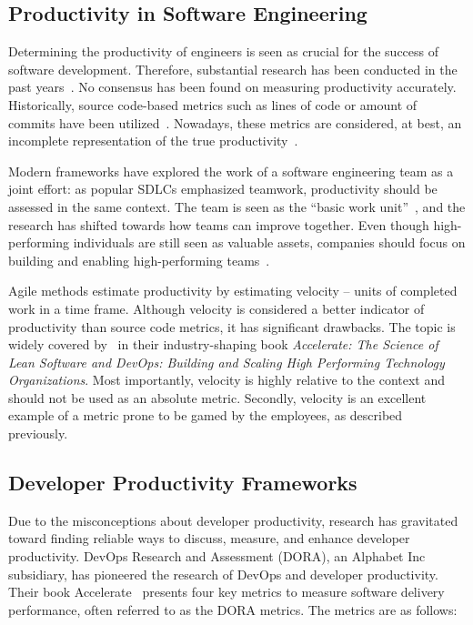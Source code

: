 \subsection{Productivity in Software Engineering}
Determining the productivity of engineers is seen as crucial for the success of software development. Therefore, substantial research has been conducted in the past years~\cite{oliveira_code_2020}. No consensus has been found on measuring productivity accurately. Historically, source code-based metrics such as lines of code or amount of commits have been utilized~\cite{oliveira_code_2020}. Nowadays, these metrics are considered, at best, an incomplete representation of the true productivity~\cite{forsgren_space_2021}.

Modern frameworks have explored the work of a software engineering team as a joint effort: as popular SDLCs emphasized teamwork, productivity should be assessed in the same context. The team is seen as the ``basic work unit''~\cite{moe_overcoming_2010}, and the research has shifted towards how teams can improve together. Even though high-performing individuals are still seen as valuable assets, companies should focus on building and enabling high-performing teams~\cite{forsgren_space_2021}. 

Agile methods estimate productivity by estimating velocity – units of completed work in a time frame. Although velocity is considered a better indicator of productivity than source code metrics, it has significant drawbacks. The topic is widely covered by \citet{forsgren_accelerate_2018}~in their industry-shaping book \textit{Accelerate: The Science of Lean Software and DevOps: Building and Scaling High Performing Technology Organizations}. Most importantly, velocity is highly relative to the context and should not be used as an absolute metric. Secondly, velocity is an excellent example of a metric prone to be gamed by the employees, as described previously.~\cite{forsgren_accelerate_2018}
 
\subsection{Developer Productivity Frameworks}

Due to the misconceptions about developer productivity, research has gravitated toward finding reliable ways to discuss, measure, and enhance developer productivity. DevOps Research and Assessment (DORA), an Alphabet Inc subsidiary, has pioneered the research of DevOps and developer productivity. Their book Accelerate~\cite{forsgren_accelerate_2018} presents four key metrics to measure software delivery performance, often referred to as the DORA metrics. The metrics are as follows: 

